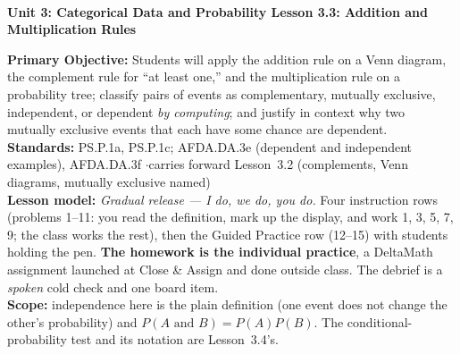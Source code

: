 \documentclass[10pt]{article}
\newcommand{\UnitNumberName}{Unit 3: Categorical Data and Probability \quad}
\newcommand{\LessonNumberName}{Lesson 3.3: Addition and Multiplication Rules}
\begin{document}
\begin{center}
    {\Large\bfseries \CourseName \\
    {\small\bfseries \UnitNumberName \LessonNumberName}}
\end{center}

\begin{tcolorbox}[colback=frost, colframe=cerulean, boxrule=0.9pt, arc=2mm,
    left=2mm, right=2mm, top=1.5mm, bottom=1.5mm]
    \textbf{Primary Objective:} Students will apply the addition rule on a Venn diagram, the
    complement rule for ``at least one,'' and the multiplication rule on a probability tree;
    classify pairs of events as complementary, mutually exclusive, independent, or dependent
    \emph{by computing}; and justify in context why two mutually exclusive events that each have
    some chance are dependent.
    \\[2pt]
    \textbf{Standards:} PS.P.1a, PS.P.1c; AFDA.DA.3e (dependent and independent examples),
    AFDA.DA.3f \quad$\cdot$\quad carries forward Lesson~3.2 (complements, Venn diagrams,
    mutually exclusive named)
    \\[2pt]
    \textbf{Lesson model:} \emph{Gradual release --- I do, we do, you do.} Four instruction rows
    (problems 1--11: you read the definition, mark up the display, and work 1, 3, 5, 7, 9; the
    class works the rest), then the Guided Practice row (12--15) with students holding the pen.
    \textbf{The homework is the individual practice}, a DeltaMath assignment launched at Close
    \& Assign and done outside class. The debrief is a \emph{spoken} cold check and one board item.
    \\[2pt]
    \textbf{Scope:} independence here is the plain definition (one event does not change the
    other's probability) and $P(A \text{ and } B) = P(A)P(B)$. The conditional-probability test
    and its notation are Lesson~3.4's.
\end{tcolorbox}
\end{document}
